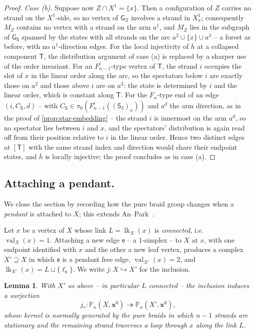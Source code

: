 \documentclass[reqno]{amsart}
\newtheorem{lemma}[theorem]{Lemma}
\theoremstyle{definition}
\newcommand\bfx{\mathbf{x}}
\newcommand\sfG{\mathsf{G}}
\newcommand\sfS{\mathsf{S}}
\newcommand\sfT{\mathsf{T}}
\newcommand\sfe{\mathsf{e}}
\newcommand{\PB}{\mathbb{P}}
\newcommand{\base}{\bfx^0}
\renewcommand{\bar}{\overline}
\DeclareMathOperator{\lk}{lk}
\DeclareMathOperator{\val}{val}
\numberwithin{equation}{section}
\begin{document}
\begin{proof}
\smallskip
\noindent\emph{Case (b).}
Suppose now \(Z\cap X^1=\{x\}\). Then a configuration of \(Z\)
carries no strand on the \(X^1\)-side, so no vertex of \(\sfG_Z\)
involves a strand in \(X^1_x\); consequently \(M_Z\) contains no
vertex with a strand on the arm \(a^1\), and \(M_Z\) lies in the
subgraph of \(\sfG_\sfS\) spanned by the states with all strands on
the arc \(a^2\cup\{x\}\cup a^3\) -- a forest as before, with no
\(a^1\)-direction edges. For the local injectivity of \(\bar h\)
at a collapsed component \(\sfT\), the distribution argument of case
(a) is replaced by a sharper use of the order invariant. For an
\(F^i_{n-1}\)-type vertex of \(\sfT\), the strand \(i\) occupies the
slot of \(x\) in the linear order along the arc, so the spectators
below \(i\) are exactly those on \(a^2\) and those above \(i\) are
on \(a^3\): the state is determined by \(i\) and the linear order,
which is constant along \(\sfT\). For the \(F_n\)-type end of an
edge \((i,C_\sfS,d)\) -- with \(C_\sfS\in\pi_0(F^i_{n-1}((\sfS_3)_x))\)
and \(a^d\) the arm direction, as in the proof of
\cref{prop:star-embedding} -- the strand \(i\) is innermost on
the arm \(a^d\), so no spectator lies between \(i\) and \(x\), and the
spectators' distribution is again read off from their position
relative to \(i\) in the linear order. Hence two distinct edges at
\([\sfT]\) with the same strand index and direction would share their
endpoint states, and \(\bar h\) is locally injective; the proof
concludes as in case (a).
\end{proof}

\subsection{Attaching a pendant.}
We close the section by recording how the pure braid group changes
when a \emph{pendant} is attached to \(X\); this extends
An--Park~\cite[Prop.~3.1]{AnPark2017}.

Let \(x\) be a vertex of \(X\) whose link \(L=\lk_X(x)\) is
\emph{connected}, i.e.\ \(\val_X(x)=1\). Attaching a
new edge \(\sfe\) -- a \(1\)-simplex -- to \(X\) at \(x\), with one
endpoint identified with \(x\) and the other a new leaf vertex,
produces a complex \(X'\supseteq X\) in which \(\sfe\) is a pendant
free edge, \(\val_{X'}(x)=2\), and
\(\lk_{X'}(x)=L\sqcup\{\ell_\sfe\}\). We write
\(j\colon X\hookrightarrow X'\) for the inclusion. 

\begin{lemma}\label{lem:pendant-edge}
With \(X'\) as above -- in particular \(L\) connected -- the
inclusion induces a surjection
\[
j_\ast\colon\PB_n(X,\base)\twoheadrightarrow
\PB_n(X',\base),
\]
whose kernel is normally generated by the pure braids in which
\(n-1\) strands are stationary and the remaining strand traverses
a loop through \(x\) along the link \(L\).
\end{lemma}
\end{document}
